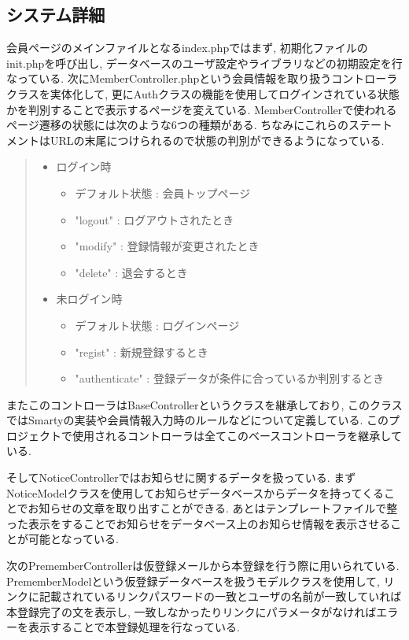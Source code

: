 \documentclass[submit,techrep]{ipsj}
\begin{document}
\subsection{システム詳細}
会員ページのメインファイルとなるindex.phpではまず, 初期化ファイルのinit.phpを呼び出し, データベースのユーザ設定やライブラリなどの初期設定を行なっている. 
次にMemberController.phpという会員情報を取り扱うコントローラクラスを実体化して, 更にAuthクラスの機能を使用してログインされている状態かを判別することで表示するページを変えている. MemberControllerで使われるページ遷移の状態には次のような6つの種類がある. ちなみにこれらのステートメントはURLの末尾につけられるので状態の判別ができるようになっている. 
\begin{quote}
 \begin{itemize}
  \item ログイン時
   \begin{itemize}
    \item デフォルト状態 : 会員トップページ
    \item "logout" : ログアウトされたとき
    \item "modify" : 登録情報が変更されたとき
    \item "delete" : 退会するとき
   \end{itemize}
 \item 未ログイン時
   \begin{itemize}
    \item デフォルト状態 : ログインページ
    \item "regist" : 新規登録するとき
    \item "authenticate" : 登録データが条件に合っているか判別するとき
   \end{itemize}
 \end{itemize}
\end{quote}


またこのコントローラはBaseControllerというクラスを継承しており, このクラスではSmartyの実装や会員情報入力時のルールなどについて定義している. このプロジェクトで使用されるコントローラは全てこのベースコントローラを継承している.

そしてNoticeControllerではお知らせに関するデータを扱っている. まずNoticeModelクラスを使用してお知らせデータベースからデータを持ってくることでお知らせの文章を取り出すことができる. 
あとはテンプレートファイルで整った表示をすることでお知らせをデータベース上のお知らせ情報を表示させることが可能となっている.  

次のPrememberControllerは仮登録メールから本登録を行う際に用いられている. 
PrememberModelという仮登録データベースを扱うモデルクラスを使用して, リンクに記載されているリンクパスワードの一致とユーザの名前が一致していれば本登録完了の文を表示し, 一致しなかったりリンクにパラメータがなければエラーを表示することで本登録処理を行なっている.  
\end{document}
